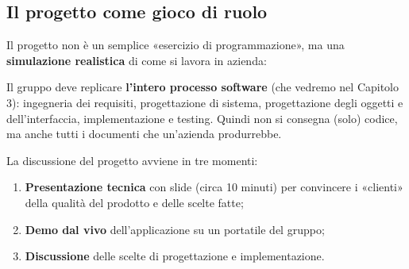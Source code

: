 \subsection{Il progetto come gioco di ruolo}

Il progetto non è un semplice «esercizio di programmazione», ma una \textbf{simulazione realistica} di come si lavora in azienda:

\begin{center}
\end{center}

Il gruppo deve replicare \textbf{l'intero processo software} (che vedremo nel Capitolo 3): ingegneria dei requisiti,
progettazione di sistema, progettazione degli oggetti e dell'interfaccia, implementazione e testing.
Quindi non si consegna (solo) codice, ma anche tutti i documenti che un'azienda produrrebbe.

La discussione del progetto avviene in tre momenti:
\begin{enumerate}
  \item \textbf{Presentazione tecnica} con slide (circa 10 minuti) per convincere i «clienti» della qualità del prodotto e delle scelte fatte;
  \item \textbf{Demo dal vivo} dell'applicazione su un portatile del gruppo;
  \item \textbf{Discussione} delle scelte di progettazione e implementazione.
\end{enumerate}

